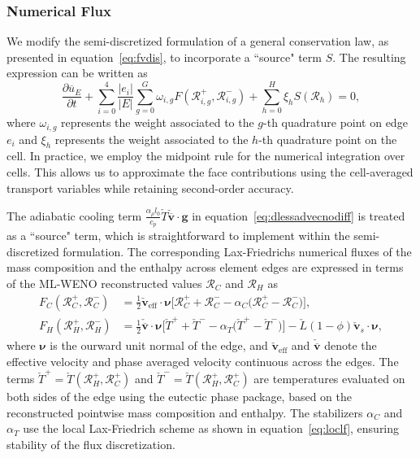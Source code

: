 \subsubsection{Numerical Flux}
We modify the semi-discretized formulation of a general conservation law, as presented in equation~\eqref{eq:fvdis},
to incorporate a ``source" term $S$. The resulting expression can be written as
\begin{equation}\label{eq:fvdis}
		  \frac{\partial \overline{u}_{E}}{\partial t} + \sum_{i=0}^4\frac{\lvert e_i \rvert}{\lvert E \rvert}
		  \sum_{g=0}^G \omega_{i,g} F(\mathcal{R}_{i,g}^+, \mathcal{R}_{i,g}^-)  
		  + \sum^H_{h=0}\xi_{h} S(\mathcal{R}_h) = 0,
\end{equation}
where $\omega_{i,g}$ represents the weight associated to the $g$-th quadrature point on edge $e_i$ and
$\xi_{h}$ represents the weight associated to the $h$-th quadrature point on the cell.
In practice, we employ the midpoint rule for the numerical integration over cells.
This allows us to approximate the face contributions using the cell-averaged transport variables while 
retaining second-order accuracy.

The adiabatic cooling term $\frac{\alpha_\rho l_0}{c_p} \check{T} \check{\overline{\mathbf{v}}} \cdot \mathbf{g}$ in equation~\eqref{eq:dlessadvecnodiff} is 
treated as a ``source" term, which is 
straightforward to implement within the semi-discretized formulation.
The corresponding Lax-Friedrichs numerical fluxes of the mass composition and the enthalpy across
element edges are expressed 
in terms of the ML-WENO reconstructed values $\mathcal{R}_C$ and $\mathcal{R}_H$ as
\begin{equation}
\label{eq:numflux}
\begin{aligned}
		  F_C(\mathcal{R}^+_C, \mathcal{R}^-_C) &= \frac{1}{2}\check{\mathbf{v}}_{\text{eff}}\cdot \pmb{\nu}
		  \Big[\mathcal{R}^+_C + \mathcal{R}^-_C - \alpha_C\big(\mathcal{R}^+_C - \mathcal{R}^-_C\big)\Big],\\
		  F_H(\mathcal{R}^+_H, \mathcal{R}^-_H) &= 
		  \frac{1}{2}\check{\overline{\mathbf{v}}}\cdot \pmb{\nu}
		  \Big[\check{T}^+ + \check{T}^- - \alpha_T \big(\check{T}^+ - \check{T}^-\big)  \Big] - \check{L} (1-\phi)\check{\mathbf{v}}_s\cdot\pmb{\nu},
\end{aligned}
\end{equation}
where $\pmb{\nu}$ is the ourward unit normal of the edge, and $\check{\mathbf{v}}_{\text{eff}}$ and $\check{\overline{\mathbf{v}}}$ 
denote the effective velocity and phase averaged velocity continuous across the edges.
The terms $\check{T}^+ = \check{T}(\mathcal{R}^+_H, \mathcal{R}^+_C)$ 
and $\check{T}^- = \check{T}(\mathcal{R}^+_H, \mathcal{R}^+_C)$ 
are temperatures evaluated on both sides of the edge using the eutectic
phase package, based on the reconstructed pointwise mass composition and enthalpy. 
The stabilizers $\alpha_C$ and $\alpha_T$ use the local Lax-Friedrich scheme as shown in equation~\eqref{eq:loclf},
ensuring stability of the flux discretization.

